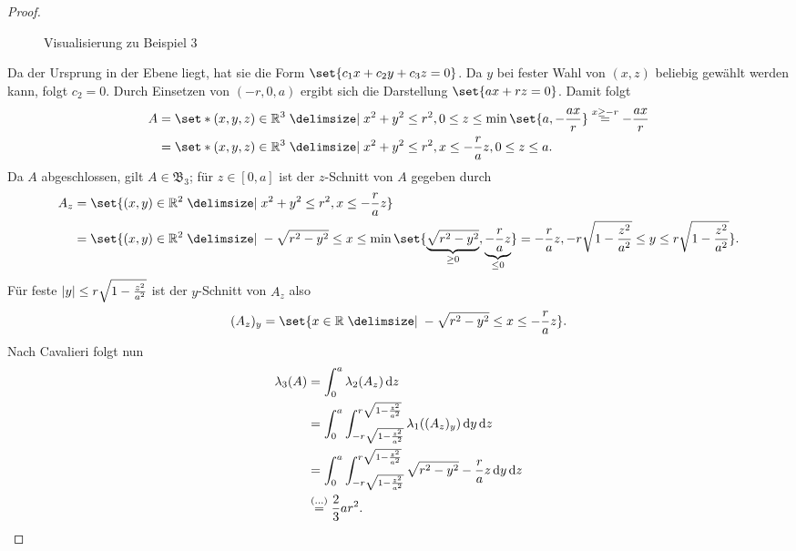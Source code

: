 \documentclass[a4paper, parskip=half]{scrartcl}
\theoremstyle{definition}
\theoremstyle{remark}
\begin{document}
\begin{proof}
\begin{figure}[h]
			\caption{Visualisierung zu Beispiel 3}
		\end{figure}
		Da der Ursprung in der Ebene liegt, hat sie die Form $\set{c_1x+c_2y+c_3z=0}$. Da $y$
		bei fester Wahl von $(x, z)$ beliebig gewählt werden kann, folgt $c_2=0$. Durch
		Einsetzen von $(-r, 0, a)$ ergibt sich die Darstellung $\set{ax+rz=0}$. Damit folgt
		\begin{align*}
			A &= \set*{(x, y, z)\in\mathbb{R}^3\given x^2+y^2 \leq r^2, 0\leq z\leq\min\set{a, -\frac{ax}{r}}\overset{x\geq -r}{=} -\frac{ax}{r}}\\
				&= \set*{(x, y, z)\in\mathbb{R}^3\given x^2+y^2\leq r^2, x\leq -\frac{r}{a}z, 0\leq z\leq a}.
		\end{align*}
		Da $A$ abgeschlossen, gilt $A\in\mathfrak{B}_3$; für $z\in[0, a]$ ist der $z$-Schnitt von $A$ gegeben durch
		\begin{align*}
			A_z &= \set{(x, y)\in\mathbb{R}^2\given x^2+y^2\leq r^2, x\leq -\frac{r}{a}z}\\
				&= \set{(x, y)\in\mathbb{R}^2\given -\sqrt{r^2-y^2}\leq x\leq\min\set{\underbrace{\sqrt{r^2-y^2}}_{\geq 0}, \underbrace{-\frac{r}{a}z}_{\leq 0}} = -\frac{r}{a}z,
					-r\sqrt{1-\frac{z^2}{a^2}}\leq y\leq r\sqrt{1-\frac{z^2}{a^2}}}.
		\end{align*}
		Für feste $\abs{y}\leq r\sqrt{1-\frac{z^2}{a^2}}$ ist der $y$-Schnitt von $A_z$ also
		\[
			(A_z)_y = \set{x\in\mathbb{R}\given -\sqrt{r^2-y^2}\leq x\leq -\frac{r}{a}z}.
		\]
		Nach Cavalieri folgt nun
		\begin{align*}
			\lambda_3(A) &= \int_0^a\lambda_2(A_z)\dd{z}\\
				&= \int_0^a\int_{-r\sqrt{1-\frac{z^2}{a^2}}}^{r\sqrt{1-\frac{z^2}{a^2}}}\lambda_1((A_z)_y)\dd{y}\dd{z}\\
				&= \int_0^a\int_{-r\sqrt{1-\frac{z^2}{a^2}}}^{r\sqrt{1-\frac{z^2}{a^2}}}\sqrt{r^2-y^2}-\frac{r}{a}z\dd{y}\dd{z}\\
				&\overset{(\ldots)}{=}\frac{2}{3}ar^2.\qedhere
		\end{align*}
	\end{proof}
\end{document}
